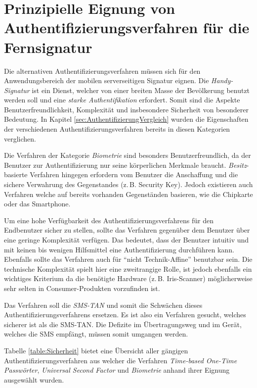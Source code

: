 \documentclass[11pt,a4paper,ngerman]{scrreprt}
\begin{document}
\section{Prinzipielle Eignung von Authentifizierungsverfahren für die Fernsignatur}
Die alternativen Authentifizierungsverfahren müssen sich für den Anwendungsbereich der mobilen serverseitigen Signatur eignen. Die \textit{Handy-Signatur} ist ein Dienst, welcher von einer breiten Masse der Bevölkerung benutzt werden soll und eine \emph{starke Authentifikation} erfordert. Somit sind die Aspekte Benutzerfreundlichkeit, Komplexität und insbesondere Sicherheit von besonderer Bedeutung. In Kapitel \ref{sec:AuthentifizierungVergleich} wurden die Eigenschaften der verschiedenen Authentifizierungsverfahren bereits in diesen Kategorien verglichen.
\begin{description}[font=\rmfamily]
    \item[Benutzerfreundlichkeit:] Die Verfahren der Kategorie \emph{Biometrie} sind besonders Benutzerfreundlich, da der Benutzer zur Authentifizierung nur seine körperlichen Merkmale braucht. \emph{Besitz}-basierte Verfahren hingegen erfordern vom Benutzer die Anschaffung und die sichere Verwahrung des Gegenstandes (z.\,B. Security Key). Jedoch existieren auch Verfahren welche auf bereits vorhanden Gegenständen basieren, wie die Chipkarte oder das Smartphone.
    \item[Komplexität:] Um eine hohe Verfügbarkeit des Authentifizierungsverfahrens für den Endbenutzer sicher zu stellen, sollte das Verfahren gegenüber dem Benutzer über eine geringe Komplexität verfügen. Das bedeutet, dass der Benutzer intuitiv und mit keinen bis wenigen Hilfsmittel eine Authentifizierung durchführen kann. Ebenfalls sollte das Verfahren auch für ``nicht Technik-Affine'' benutzbar sein. Die technische Komplexität spielt hier eine zweitrangige Rolle, ist jedoch ebenfalls ein wichtiges Kriterium da die benötigte Hardware (z.\,B. Iris-Scanner) möglicherweise sehr selten in Consumer-Produkten vorzufinden ist.
    \item[Sicherheit:] Das Verfahren soll die \textit{SMS-TAN} und somit die Schwächen dieses Authentifizierungsverfahrens ersetzen. Es ist also ein Verfahren gesucht, welches sicherer ist als die SMS-TAN. Die Defizite im Übertragungsweg und im Gerät, welches die SMS empfängt, müssen somit umgangen werden.
\end{description}
Tabelle \ref{table:Sicherheit} bietet eine Übersicht aller gängigen Authentifizierungsverfahren aus welcher die Verfahren \textit{Time-based One-Time Passwörter}, \textit{Universal Second Factor} und \textit{Biometrie} anhand ihrer Eignung ausgewählt wurden.
\end{document}
